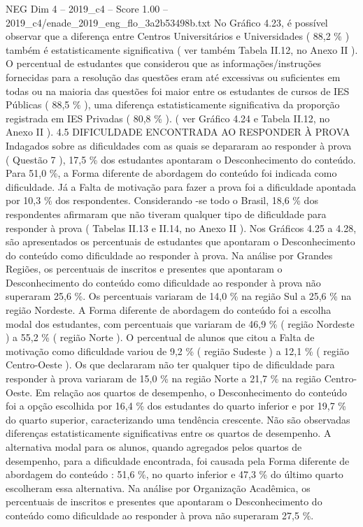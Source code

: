 \begin{textsample}{NEG Dim 4 – 2019\_c4 – Score 1.00 – 2019\_c4/enade\_2019\_eng\_flo\_3a2b53498b.txt}
No Gráfico 4.23, é possível observar que a diferença entre Centros Universitários e Universidades ( 88,2 \% ) também é estatisticamente significativa ( ver também Tabela II.12, no Anexo II ).
O percentual de estudantes que considerou que as informações/instruções fornecidas para a resolução das questões eram até excessivas ou suficientes em todas ou na maioria das questões foi maior entre os estudantes de cursos de IES Públicas ( 88,5 \% ), uma diferença estatisticamente significativa da proporção registrada em IES Privadas ( 80,8 \% ). ( ver Gráfico 4.24 e Tabela II.12, no Anexo II ). 4.5 DIFICULDADE ENCONTRADA AO RESPONDER À PROVA Indagados sobre as dificuldades com as quais se depararam ao responder à prova ( Questão 7 ), 17,5 \% dos estudantes apontaram o Desconhecimento do conteúdo.
Para 51,0 \%, a Forma diferente de abordagem do conteúdo foi indicada como dificuldade.
Já a Falta de motivação para fazer a prova foi a dificuldade apontada por 10,3 \% dos respondentes.
Considerando -se todo o Brasil, 18,6 \% dos respondentes afirmaram que não tiveram qualquer tipo de dificuldade para responder à prova ( Tabelas II.13 e II.14, no Anexo II ).
Nos Gráficos 4.25 a 4.28, são apresentados os percentuais de estudantes que apontaram o Desconhecimento do conteúdo como dificuldade ao responder à prova.
Na análise por Grandes Regiões, os percentuais de inscritos e presentes que apontaram o Desconhecimento do conteúdo como dificuldade ao responder à prova não superaram 25,6 \%.
Os percentuais variaram de 14,0 \% na região Sul a 25,6 \% na região Nordeste.
A Forma diferente de abordagem do conteúdo foi a escolha modal dos estudantes, com percentuais que variaram de 46,9 \% ( região Nordeste ) a 55,2 \% ( região Norte ).
O percentual de alunos que citou a Falta de motivação como dificuldade variou de 9,2 \% ( região Sudeste ) a 12,1 \% ( região Centro-Oeste ).
Os que declararam não ter qualquer tipo de dificuldade para responder à prova variaram de 15,0 \% na região Norte a 21,7 \% na região Centro-Oeste.
Em relação aos quartos de desempenho, o Desconhecimento do conteúdo foi a opção escolhida por 16,4 \% dos estudantes do quarto inferior e por 19,7 \% do quarto superior, caracterizando uma tendência crescente.
Não são observadas diferenças estatisticamente significativas entre os quartos de desempenho.
A alternativa modal para os alunos, quando agregados pelos quartos de desempenho, para a dificuldade encontrada, foi causada pela Forma diferente de abordagem do conteúdo : 51,6 \%, no quarto inferior e 47,3 \% do último quarto escolheram essa alternativa.
Na análise por Organização Acadêmica, os percentuais de inscritos e presentes que apontaram o Desconhecimento do conteúdo como dificuldade ao responder à prova não superaram 27,5 \%.

\end{textsample}

